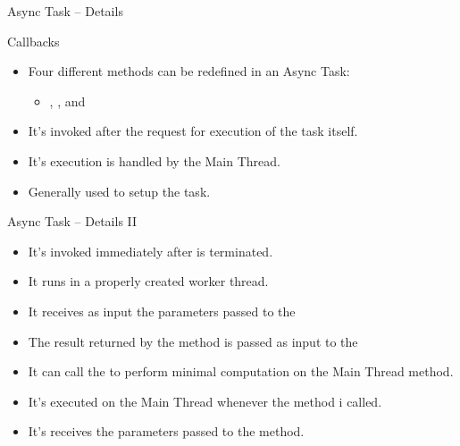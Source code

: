 \documentclass{beamer}
\begin{document}
  \begin{frame}[allowframebreaks]{Async Task -- Details}
    \begin{block}{Callbacks}
      \begin{itemize}
        \item Four different methods can be redefined in an Async Task:
        \begin{itemize}
          \item \small{, ,
           and }
        \end{itemize}
      \end{itemize}
    \end{block}

    \begin{block}{}
      \begin{itemize}
        \item It's invoked after the request for execution of the task itself. 
        \item It's execution is handled by the Main Thread.
        \item Generally used to setup the task.
      \end{itemize} 
    \end{block}
  \end{frame}

  \begin{frame}{Async Task -- Details II}
    \begin{block}{}
      \begin{itemize}
        \item It's invoked immediately after  is terminated.
        \item It runs in a properly created worker thread.
        \item It receives as input the parameters passed to the 
        \item The result returned by the method is passed as input to the
        \item It can call the  to perform minimal
        computation on the Main Thread  method.
      \end{itemize}
    \end{block}

    \begin{block}{}
      \begin{itemize}
        \item It's executed on the Main Thread whenever the
         method i called.
        \item It's receives the parameters passed to the  method.
      \end{itemize}
    \end{block}

  \end{frame}
\end{document}
